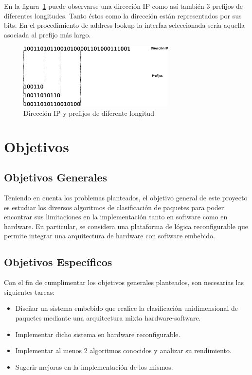 En la figura~\ref{fig:prefijos} puede observarse una dirección IP como así también 3 prefijos de diferentes longitudes. Tanto éstos como la dirección están representados por sus bits. En el procedimiento de address lookup la interfaz seleccionada sería aquella asociada al prefijo más largo.

 \begin{figure}[h]
  \centering
	 \includegraphics[width=0.7\textwidth]{1-introduccion/graf/prefijos.eps}
  \caption{Dirección IP y prefijos de diferente longitud}
  \label{fig:prefijos}
\end{figure}



\section{Objetivos}
\subsection{Objetivos Generales}
Teniendo en cuenta los problemas planteados, el objetivo general de este proyecto es estudiar los diversos algoritmos de clasificación de paquetes para poder encontrar sus limitaciones en la implementación tanto en software como en hardware. 
En particular, se considera una plataforma de lógica reconfigurable que permite integrar una arquitectura de hardware con software embebido.

\subsection{Objetivos Específicos}
Con el fin de cumplimentar los objetivos generales planteados, son necesarias las siguientes tareas:

    \begin{itemize}     

     	\item Diseñar un sistema embebido que realice la clasificación unidimensional de paquetes mediante una arquitectura mixta hardware-software.
	\item Implementar dicho sistema en hardware reconfigurable.
	\item Implementar al menos 2 algoritmos conocidos y analizar su rendimiento.
	\item Sugerir mejoras en la implementación de los mismos.

\end{itemize}


